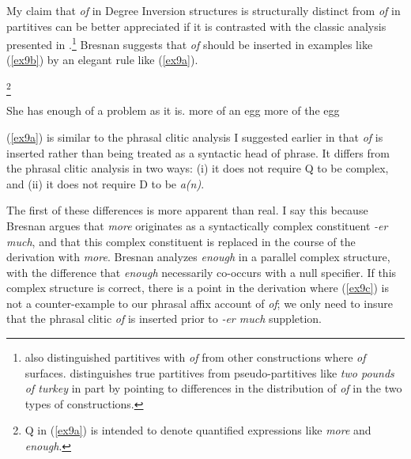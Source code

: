 \documentclass[output=paper,
modfonts
]{LSP/langsci}
\begin{document}
{{{My claim that {\textit{of}} in Degree Inversion structures is structurally distinct from {\textit{of}} in partitives can be better appreciated if it is contrasted with the classic analysis presented in {\citet{Bresnan73}}.{\footnote{ {\citet{Stockwell73}} also distinguished partitives with {\textit{of}} from other constructions where {\textit{of}} surfaces.  {\citet{Selkirk77}} distinguishes true partitives from pseudo-partitives like {\textit{two pounds of turkey}} in part by pointing to differences in the distribution of {\textit{of}} in the two types of constructions.}}
  Bresnan suggests that {\textit{of}} should be inserted in examples like ({\ref{ex9b}}) by an elegant rule like ({\ref{ex9a}}).{\footnote{Q in ({\ref{ex9a}}) is intended to denote quantified expressions like {\textit{more}} and {\textit{enough}}. }

\begin{exe}
\ex\label{ex9a}  
\ex\label{ex9b}  She has enough of a problem as it is.
\ex\label{ex9c}  more of an egg
\ex\label{ex9d}  more of the egg
\end{exe}
({\ref{ex9a}}) is similar to the phrasal clitic analysis I suggested earlier in that {\textit{of}} is inserted rather than being treated as a syntactic head of phrase.  It differs from the phrasal clitic analysis in two ways:  (i)  it does not require Q to be complex, and (ii) it does not require D to be {\textit{a(n)}}.  

The first of these differences is more apparent than real.  I say this because Bresnan argues that {\textit{more}} originates as a syntactically complex constituent {\textit{-er much}}, and that this complex constituent is replaced in the course of the derivation with {\textit{more}}.  Bresnan analyzes {\textit{enough}} in a parallel complex structure, with the difference that {\textit{enough}} necessarily co-occurs with a null specifier.  If this complex structure is correct, there is a point in the derivation where ({\ref{ex9c}}) is not a counter-example to our phrasal affix account of {\textit{of}}; we only need to insure that the phrasal clitic {\textit{of}} is inserted prior to {\textit{-er much}} suppletion.

}}}}
\end{document}
